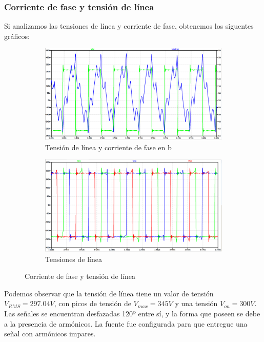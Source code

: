 \documentclass[e4_tp3_main.tex]{subfiles}
\begin{document}
\subsubsection{Corriente de fase y tensi\'on de l\'inea}
Si analizamos las tensiones de línea y corriente de fase, obtenemos los siguentes gráficos:



\begin{figure}[H]
  \begin{subfigure}[b]{0.49\textwidth}
  \centering
    \includegraphics[width=0.9\linewidth]{Imagenes/3-1-a-linea.png}
    \caption{Tensi\'on de l\'inea y corriente de fase en b}
    \label{fig:f1}
  \end{subfigure}
  \hfill
  \begin{subfigure}[b]{0.49\textwidth}
  \centering
    \includegraphics[width=0.9\linewidth]{Imagenes/3-1-a-lineas.png}
    \caption{Tensiones de l\'inea}
    \label{fig:f2}
  \end{subfigure}
  \caption{Corriente de fase y tensi\'on de l\'inea}
\end{figure}


Podemos observar que la tensión de línea tiene un valor de tensión $V_{RMS}=297.04V$, con picos de tensión de $V_{max}=345 V$ y una tensión $V_{on}=300V$. 
Las señales se encuentran desfazadas 120º entre sí, y la forma que poseen se debe a la presencia de armónicos. La fuente fue configurada para que entregue una señal con arm\'onicos impares.
\end{document}
